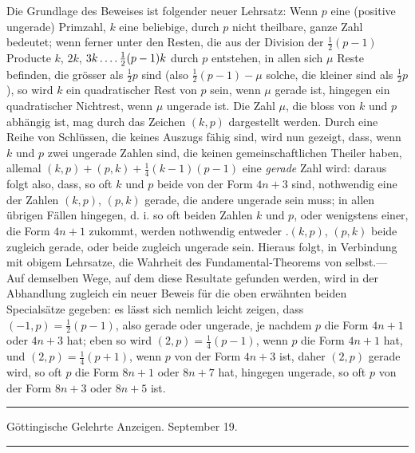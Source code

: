 Die Grundlage des Beweises ist folgender neuer Lehrsatz: Wenn $p$ eine (positive ungerade) Primzahl, $k$ eine beliebige, durch $p$ nicht theilbare, ganze Zahl bedeutet; wenn ferner unter den Resten, die aus der Division der $\frac12(p-1)$ Producte $k$, $2k$, $3k\mathinner{.\,.\,.\,.}\frac12(p-1)k$ durch $p$ entstehen, in allen sich $\mu$ Reste befinden, die grösser als $\frac12p$ sind (also $\frac12(p-1)-\mu$ solche, die kleiner sind als $\frac12p$), so wird $k$ ein quadratischer Rest von $p$ sein, wenn $\mu$ gerade ist, hingegen ein quadratischer Nichtrest, wenn $\mu$ ungerade ist. Die Zahl $\mu$, die bloss von $k$
%
und $p$ abhängig ist, mag durch das Zeichen $(k,p)$ dargestellt werden. Durch eine Reihe von Schlüssen, die keines Auszugs fähig sind, wird nun gezeigt, dass, wenn $k$ und $p$ zwei ungerade Zahlen sind, die keinen gemeinschaftlichen Theiler haben, allemal $(k,p)+(p,k)+\frac14(k-1)(p-1)$ eine \emph{gerade} Zahl wird: daraus folgt also, dass, so oft $k$ und $p$ beide von der Form $4n+3$ sind, nothwendig eine der Zahlen $(k,p)$, $(p,k)$ gerade, die andere ungerade sein muss; in allen übrigen Fällen hingegen, d. i. so oft beiden Zahlen $k$ und $p$, oder wenigstens einer, die Form $4n+1$ zukommt, werden nothwendig entweder .$(k,p)$, $(p,k)$ beide zugleich gerade, oder beide zugleich ungerade sein. Hieraus folgt, in Verbindung mit obigem Lehrsatze, die Wahrheit des Fundamental-Theorems von selbst.--- Auf demselben Wege, auf dem diese Resultate gefunden werden, wird in der Abhandlung zugleich ein neuer Beweis für die oben erwähnten beiden Specialsätze gegeben: es lässt sich nemlich leicht zeigen, dass $(-1,p)=\frac12(p-1)$, also gerade oder ungerade, je nachdem $p$ die Form $4n+1$ oder $4n+3$ hat; eben so wird $(2,p)=\frac14(p-1)$, wenn $p$ die Form $4n+1$ hat, und $(2,p)=\frac14(p+1)$, wenn $p$ von der Form $4n+3$ ist, daher $(2,p)$ gerade wird, so oft $p$ die Form $8n+1$ oder $8n+7$ hat, hingegen ungerade, so oft $p$ von der Form $8n+3$ oder $8n+5$ ist.

\clearpage{}%
\begin{center}
\rule{.98\linewidth}{.3pt}\par
Göttingische Gelehrte Anzeigen. September 19.\par
\rule{.98\linewidth}{.3pt}
\end{center}

